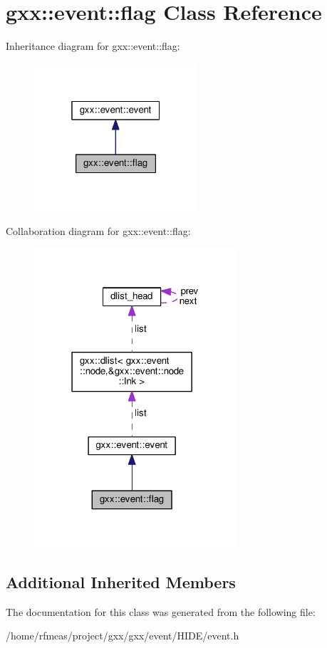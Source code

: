 \hypertarget{classgxx_1_1event_1_1flag}{}\section{gxx\+:\+:event\+:\+:flag Class Reference}
\label{classgxx_1_1event_1_1flag}


Inheritance diagram for gxx\+:\+:event\+:\+:flag\+:
\nopagebreak
\begin{figure}[H]
\begin{center}
\leavevmode
\includegraphics[width=172pt]{classgxx_1_1event_1_1flag__inherit__graph}
\end{center}
\end{figure}


Collaboration diagram for gxx\+:\+:event\+:\+:flag\+:
\nopagebreak
\begin{figure}[H]
\begin{center}
\leavevmode
\includegraphics[width=214pt]{classgxx_1_1event_1_1flag__coll__graph}
\end{center}
\end{figure}
\subsection*{Additional Inherited Members}


The documentation for this class was generated from the following file\+:\begin{DoxyCompactItemize}
\item 
/home/rfmeas/project/gxx/gxx/event/\+H\+I\+D\+E/event.\+h\end{DoxyCompactItemize}

